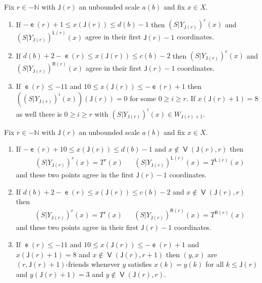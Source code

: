 \documentclass[AHL,Unicode,longabstracts,published]{cedram}
\DeclareMathOperator{\lst}{\mathsf{e}}
\DeclareMathOperator{\bad}{\mathsf{V}}
\newcommand{\N}{\mathbb{N}}
\newcommand{\lft}{\mathsf{L}}
\newcommand{\rht}{\mathsf{R}}
\newcommand{\scl}{\mathsf{J}}
\begin{document}
\begin{lemm}\label{lem:reduction negative}
Fix $r \in -\N$ with $\scl(r)$ an unbounded scale $a(b)$ and fix $x \in X$.
\begin{enumerate}
\item\label{lem:neg red S left}
If $-\lst(r)+1 \le x(\scl(r)) \le d(b) -1$ then $(S|Y_{\scl(r)})^r(x)$ and $(S|Y_{\scl(r)})^{\lft(r)}(x)$ agree in their first $\scl(r) - 1$ coordinates.
\item\label{lem:neg red S right}
If $d(b) + 2 - \lst(r) \le x(\scl(r)) \le c(b)-2$ then $(S|Y_{\scl(r)})^r(x)$ and $(S|Y_{\scl(r)})^{\rht(r)}(x)$ agree in their first $\scl(r)-1$ coordinates.
\item\label{lem: neg red S bdd}
If $\lst(r) \leq -11$ and $10 \le x(\scl(r)) \le -\lst(r) + 1$ then $((S|Y_{\scl(r)})^i(x))(\scl(r)) = 0$ for some $0 \ge i \ge r$. If $x(\scl(r) + 1) = 8$ as well there is $0 \ge i \ge r$ with $(S|Y_{\scl(r)})^i(x) \in W_{\scl(r) + 1}$.
\end{enumerate}
\end{lemm}


\begin{coro}\label{cor:neg reduc conseq}
Fix $r \in -\N$ with $\scl(r)$ an unbounded scale $a(b)$ and fix $x \in X$.
\begin{enumerate}
\item\label{cor:neg red T left}
If $- \lst(r) + 10 \le x(\scl(r)) \le d(b)-1$ and $x \notin \bad(\scl(r),r)$ then
\begin{align*}
&(S|Y_{\scl(r)})^r(x) = T^r(x)
&&(S|Y_{\scl(r)})^{\lft(r)}(x) = T^{\lft(r)}(x)
\end{align*}
and these two points agree in the first $\scl(r)-1$ coordinates.
\item\label{cor:neg red T right}
If $d(b) + 2 - \lst(r) \le x(\scl(r)) \le c(b)-2$ and $x \notin \bad(\scl(r),r)$ then
\begin{align*}
&(S|Y_{\scl(r)})^r(x)=T^r(x)
&&(S|Y_{\scl(r)})^{\rht(r)}(x)=T^{\rht(r)}(x)
\end{align*}
and these two points agree in their first $\scl(r)-1$ coordinates.
\item\label{conc:neg reduc friends}
If $\lst(r) \leq -11$ and $10 \le x(\scl(r)) \le -\lst(r) + 1$ and $x(\scl(r)+1) = 8$ and $x \notin \bad(\scl(r),r+1)$ then $(y,x)$ are $(r,\scl(r) + 1)$-friends whenever $y$ satisfies $x(k) = y(k)$ for all $k \le \scl(r)$ and $y(\scl(r) + 1) = 3$ and $y \notin \bad(\scl(r),r)$.
\end{enumerate}
\end{coro}
\end{document}
